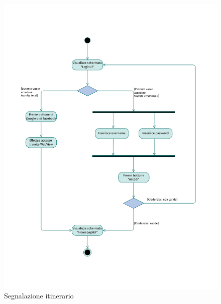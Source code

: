 \documentclass{natourDoc}
\begin{document}
\newpage
\begin{figure}[!htbp]
	\centering
	\includegraphics[width=\textwidth, page=13]{./diagrams/activity.pdf}
	\caption{Segnalazione itinerario}
\end{figure}
\FloatBarrier

\newpage
\end{document}
